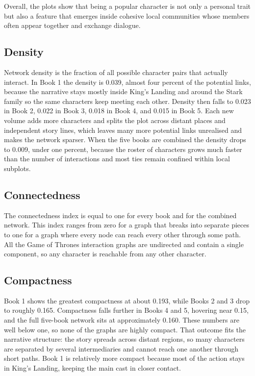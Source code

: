 \documentclass[12pt, a4paper]{article}
\begin{document}
   Overall, the plots show that being a popular character is not only a personal trait but also a feature that emerges inside cohesive local communities whose members often appear together and exchange dialogue.

\subsection*{Density}
Network density is the fraction of all possible character pairs that actually interact. In Book 1 the density is 0.039, almost four percent of the potential links, because the narrative stays mostly inside King's Landing and around the Stark family so the same characters keep meeting each other. Density then falls to 0.023 in Book 2, 0.022 in Book 3, 0.018 in Book 4, and 0.015 in Book 5. Each new volume adds more characters and splits the plot across distant places and independent story lines, which leaves many more potential links unrealised and makes the network sparser. When the five books are combined the density drops to 0.009, under one percent, because the roster of characters grows much faster than the number of interactions and most ties remain confined within local subplots.

\subsection*{Connectedness}
The connectedness index is equal to one for every book and for the combined network. This index ranges from zero for a graph that breaks into separate pieces to one for a graph where every node can reach every other through some path. All the Game of Thrones interaction graphs are undirected and contain a single component, so any character is reachable from any other character.
\subsection*{Compactness}
Book 1 shows the greatest compactness at about 0.193, while Books 2 and 3 drop to roughly 0.165. Compactness falls further in Books 4 and 5, hovering near 0.15, and the full five-book network sits at approximately 0.160. These numbers are well below one, so none of the graphs are highly compact. That outcome fits the narrative structure: the story spreads across distant regions, so many characters are separated by several intermediaries and cannot reach one another through short paths. Book 1 is relatively more compact because most of the action stays in King's Landing, keeping the main cast in closer contact.
\end{document}

